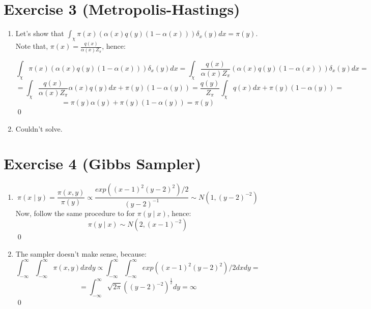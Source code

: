 \documentclass[12pt,letterpaper]{article}
\begin{document}
\newpage
\section*{Exercise 3 (Metropolis-Hastings)}
\begin{enumerate}[leftmargin=!,labelindent=5pt]

\item Let's show that
$\int_\chi \pi(x)(\alpha(x)q(y) (1-\alpha(x)))\delta_x(y) dx = \pi(y)$.
Note that, $\pi(x) = \frac{q(x)}{\alpha(x)Z_\pi}$, hence:

$$
\int_\chi \pi(x)(\alpha(x)q(y) (1-\alpha(x)))\delta_x(y) dx =
\int_\chi \frac{q(x)}{\alpha(x)Z_\pi}(\alpha(x)q(y) (1-\alpha(x)))
\delta_x(y) dx = 
$$
$$ = 
\int_\chi \frac{q(x)}{\alpha(x)Z_\pi}\alpha(x)q(y) dx +
\pi(y)(1-\alpha(y)) = 
\frac{q(y)}{Z_\pi}\int_\chi q(x)dx +\pi(y)(1-\alpha(y)) =
$$
$$
 = \pi(y)\alpha(y) + \pi(y)(1-\alpha(y)) = \pi(y)
$$
\qed

\item Couldn't solve.

\end{enumerate}

\newpage
\section*{Exercise 4 (Gibbs Sampler)}
\begin{enumerate}[leftmargin=!,labelindent=5pt]
\item 
$$
\pi(x \mid y) = \frac{\pi(x,y)}{\pi(y)} \propto
\frac{exp((x-1)^2(y-2)^2)/2}{(y-2)^{-1}} \sim N(1,(y-2)^{-2})
$$
Now, follow the same procedure to for $\pi(y \mid x)$, hence:
$$
\pi(y\mid x) \sim N(2, (x-1)^{-2})
$$
\qed

\item The sampler doesn't make sense, because:
$$
\int_{-\infty}^{\infty}
\int_{-\infty}^{\infty}
\pi(x,y)dxdy \propto
\int_{-\infty}^{\infty}
\int_{-\infty}^{\infty}
exp((x-1)^2(y-2)^2)/2 dx dy =
$$
$$ = 
\int_{-\infty}^{\infty}
\sqrt{2\pi}((y-2)^{-2})^{\frac{1}{2}}dy = \infty
$$
\qed

\end{enumerate}

\newpage
\end{document}
